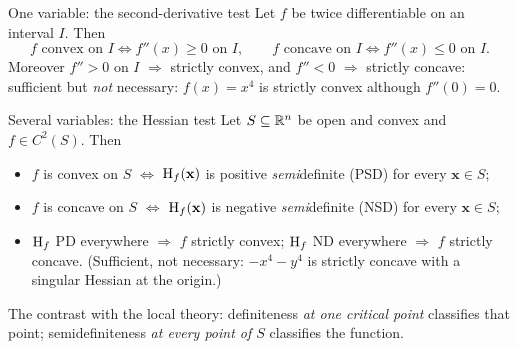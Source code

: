 \begin{rulebox}{One variable: the second-derivative test}
Let $f$ be twice differentiable on an interval $I$. Then
\[
  f \text{ convex on } I \iff f''(x)\ge0 \text{ on } I,
  \qquad
  f \text{ concave on } I \iff f''(x)\le0 \text{ on } I .
\]
Moreover $f''>0$ on $I$ $\Rightarrow$ strictly convex, and $f''<0$
$\Rightarrow$ strictly concave: sufficient but \emph{not} necessary:
$f(x)=x^{4}$ is strictly convex although $f''(0)=0$.
\end{rulebox}

\begin{rulebox}{Several variables: the Hessian test}
Let $S\subseteq\mathbb{R}^{n}$ be open and convex and $f\in C^{2}(S)$. Then
\begin{itemize}[leftmargin=1.6em,itemsep=0.3ex]
  \item $f$ is convex on $S$ $\iff$ $\operatorname{H}_f(\mathbf{x})$ is positive
        \emph{semi}definite (PSD) for every $\mathbf{x}\in S$;
  \item $f$ is concave on $S$ $\iff$ $\operatorname{H}_f(\mathbf{x})$ is negative
        \emph{semi}definite (NSD) for every $\mathbf{x}\in S$;
  \item $\operatorname{H}_f$ PD everywhere $\Rightarrow$ $f$ strictly convex;
        $\operatorname{H}_f$ ND everywhere $\Rightarrow$ $f$ strictly concave.
        (Sufficient, not necessary: $-x^{4}-y^{4}$ is strictly concave with
        a singular Hessian at the origin.)
\end{itemize}
The contrast with the local theory: definiteness \emph{at one critical
point} classifies that point; semidefiniteness \emph{at every point of $S$}
classifies the function.
\end{rulebox}

